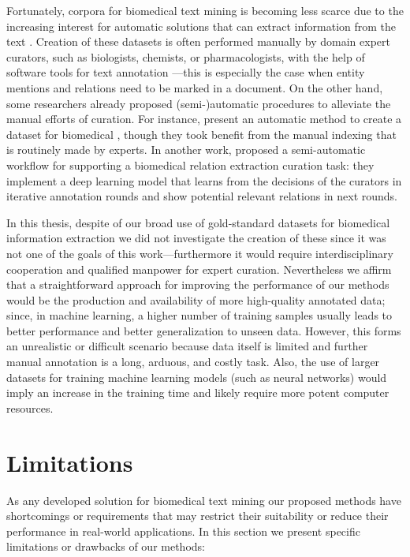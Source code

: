 Fortunately, corpora for biomedical text mining is becoming less scarce due to the increasing interest for automatic solutions that can extract information from the text \parencite{rosarioferreira2021a}.
Creation of these datasets is often performed manually by domain expert curators, such as biologists, chemists, or pharmacologists, with the help of software tools for text annotation \parencite{neves2014a,neves2021a}---this is especially the case when entity mentions and relations need to be marked in a document.
On the other hand, some researchers already proposed (semi-)automatic procedures to alleviate the manual efforts of curation.
For instance, \textcite{jimenoyepes2011a} present an automatic method to create a dataset for biomedical , though they took benefit from the manual  indexing that is routinely made by  experts.
In another work, \textcite{perezperez2022a} proposed a semi-automatic workflow for supporting a biomedical relation extraction curation task: they implement a deep learning model that learns from the decisions of the curators in iterative annotation rounds and show potential relevant relations in next rounds.

In this thesis, despite of our broad use of gold-standard datasets for biomedical information extraction we did not investigate the creation of these since it was not one of the goals of this work---furthermore it would require interdisciplinary cooperation and qualified manpower for expert curation.
Nevertheless we affirm that a straightforward approach for improving the performance of our methods would be the production and availability of more high-quality annotated data; since, in machine learning, a higher number of training samples usually leads to better performance and better generalization to unseen data.
However, this forms an unrealistic or difficult scenario because data itself is limited and further manual annotation is a long, arduous, and costly task.
Also, the use of larger datasets for training machine learning models (such as neural networks) would imply an increase in the training time and likely require more potent computer resources.


\section{Limitations}

As any developed solution for biomedical text mining our proposed methods have shortcomings or requirements that may restrict their suitability or reduce their performance in real-world applications.
In this section we present specific limitations or drawbacks of our methods:

